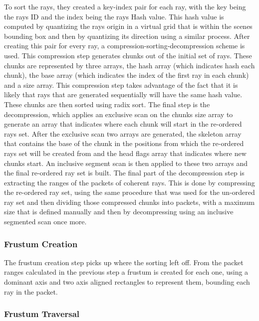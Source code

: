 \documentclass{llncs}
\begin{document}
\medskip

To sort the rays, they created a key-index pair for each ray, with the key being the rays ID and the index being the rays Hash value. This hash value is computed by quantizing the rays origin in a virtual grid that is within the scenes bounding box and then by quantizing its direction using a similar process.
After creating this pair for every ray, a compression-sorting-decompression scheme is used. This compression step generates chunks out of the initial set of rays. These chunks are represented by three arrays, the hash array (which indicates hash each chunk), the base array (which indicates the index of the first ray in each chunk) and a size array. This compression step takes advantage of the fact that it is likely that rays that are generated sequentially will have the same hash value. These chunks are then sorted using radix sort. The final step is the decompression, which applies an exclusive scan on the chunks size array to generate an array that indicates where each chunk will start in the re-ordered rays set.
After the exclusive scan two arrays are generated, the skeleton array that contains the base of the chunk in the positions from which the re-ordered rays set will be created from and the head flags array that indicates where new chunks start. An inclusive segment scan is then applied to these two arrays and the final re-ordered ray set is built. The final part of the decompression step is extracting the ranges of the packets of coherent rays. This is done by compressing the re-ordered ray set, using the same procedure that was used for the un-ordered ray set and then dividing those compressed chunks into packets, with a maximum size that is defined manually and then by decompressing using an inclusive segmented scan once more.

\subsubsection{Frustum Creation}

The frustum creation step picks up where the sorting left off. From the packet ranges calculated in the previous step a frustum is created for each one, using a dominant axis and two axis aligned rectangles to represent them, bounding each ray in the packet.

\subsubsection{Frustum Traversal}
\end{document}
